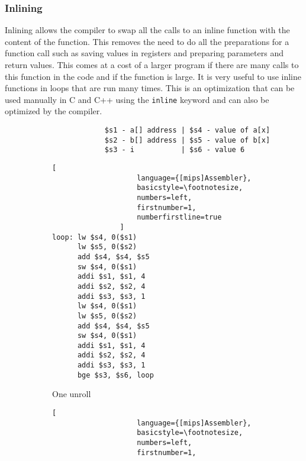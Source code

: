 \subsubsection{Inlining}
Inlining allows the compiler to swap all the calls to an inline function with the content of the function. This removes the need to do all the preparations for a function call such as saving values in registers and preparing parameters and return values. This comes at a cost of a larger program if there are many calls to this function in the code and if the function is large. It is very useful to use inline functions in loops that are run many times. This is an optimization that can be used manually in C and C++ using the \texttt{inline} keyword and can also be optimized by the compiler.

\begin{figure}[h]
    \centering
    \begin{adjustbox}{minipage=\linewidth,scale=0.8}
        \centering
        \begin{verbatim}
                  $s1 - a[] address | $s4 - value of a[x]
                  $s2 - b[] address | $s5 - value of b[x]
                  $s3 - i           | $s6 - value 6
        \end{verbatim}
        \begin{subfigure}{.55\textwidth}
            \centering
            \begin{lstlisting}[
                    language={[mips]Assembler},
                    basicstyle=\footnotesize,
                    numbers=left,
                    firstnumber=1,
                    numberfirstline=true
                ]
loop: lw $s4, 0($s1)
      lw $s5, 0($s2)
      add $s4, $s4, $s5
      sw $s4, 0($s1)
      addi $s1, $s1, 4
      addi $s2, $s2, 4
      addi $s3, $s3, 1
      lw $s4, 0($s1)
      lw $s5, 0($s2)
      add $s4, $s4, $s5
      sw $s4, 0($s1)
      addi $s1, $s1, 4
      addi $s2, $s2, 4
      addi $s3, $s3, 1
      bge $s3, $s6, loop
                \end{lstlisting}
            \caption{One unroll}
            \label{fig:optimized:sub1}
        \end{subfigure}%
        \begin{subfigure}{.3\textwidth}
            \centering
            \begin{lstlisting}[
                    language={[mips]Assembler},
                    basicstyle=\footnotesize,
                    numbers=left,
                    firstnumber=1,

\end{lstlisting}
\end{subfigure}
\end{adjustbox}
\end{figure}
